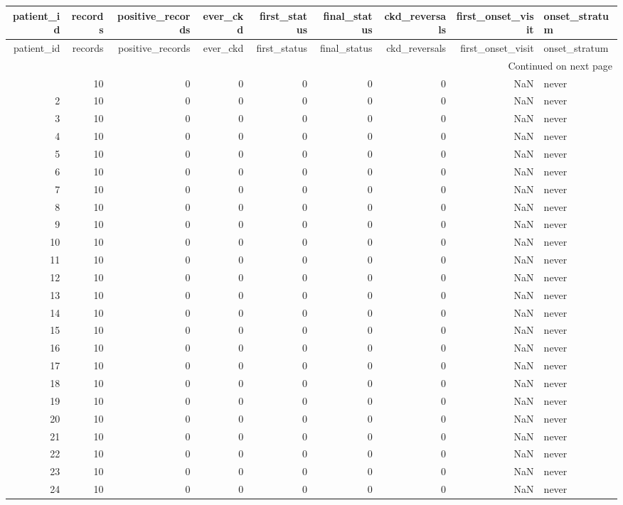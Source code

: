 \begin{longtable}{rrrrrrrrl}
\toprule
patient\_id & records & positive\_records & ever\_ckd & first\_status & final\_status & ckd\_reversals & first\_onset\_visit & onset\_stratum \\
\midrule
\endfirsthead
\toprule
patient\_id & records & positive\_records & ever\_ckd & first\_status & final\_status & ckd\_reversals & first\_onset\_visit & onset\_stratum \\
\midrule
\endhead
\midrule
\multicolumn{9}{r}{Continued on next page} \\
\midrule
\endfoot
\bottomrule
\endlastfoot
1 & 10 & 0 & 0 & 0 & 0 & 0 & NaN & never \\
2 & 10 & 0 & 0 & 0 & 0 & 0 & NaN & never \\
3 & 10 & 0 & 0 & 0 & 0 & 0 & NaN & never \\
4 & 10 & 0 & 0 & 0 & 0 & 0 & NaN & never \\
5 & 10 & 0 & 0 & 0 & 0 & 0 & NaN & never \\
6 & 10 & 0 & 0 & 0 & 0 & 0 & NaN & never \\
7 & 10 & 0 & 0 & 0 & 0 & 0 & NaN & never \\
8 & 10 & 0 & 0 & 0 & 0 & 0 & NaN & never \\
9 & 10 & 0 & 0 & 0 & 0 & 0 & NaN & never \\
10 & 10 & 0 & 0 & 0 & 0 & 0 & NaN & never \\
11 & 10 & 0 & 0 & 0 & 0 & 0 & NaN & never \\
12 & 10 & 0 & 0 & 0 & 0 & 0 & NaN & never \\
13 & 10 & 0 & 0 & 0 & 0 & 0 & NaN & never \\
14 & 10 & 0 & 0 & 0 & 0 & 0 & NaN & never \\
15 & 10 & 0 & 0 & 0 & 0 & 0 & NaN & never \\
16 & 10 & 0 & 0 & 0 & 0 & 0 & NaN & never \\
17 & 10 & 0 & 0 & 0 & 0 & 0 & NaN & never \\
18 & 10 & 0 & 0 & 0 & 0 & 0 & NaN & never \\
19 & 10 & 0 & 0 & 0 & 0 & 0 & NaN & never \\
20 & 10 & 0 & 0 & 0 & 0 & 0 & NaN & never \\
21 & 10 & 0 & 0 & 0 & 0 & 0 & NaN & never \\
22 & 10 & 0 & 0 & 0 & 0 & 0 & NaN & never \\
23 & 10 & 0 & 0 & 0 & 0 & 0 & NaN & never \\
24 & 10 & 0 & 0 & 0 & 0 & 0 & NaN & never \\

\end{longtable}
